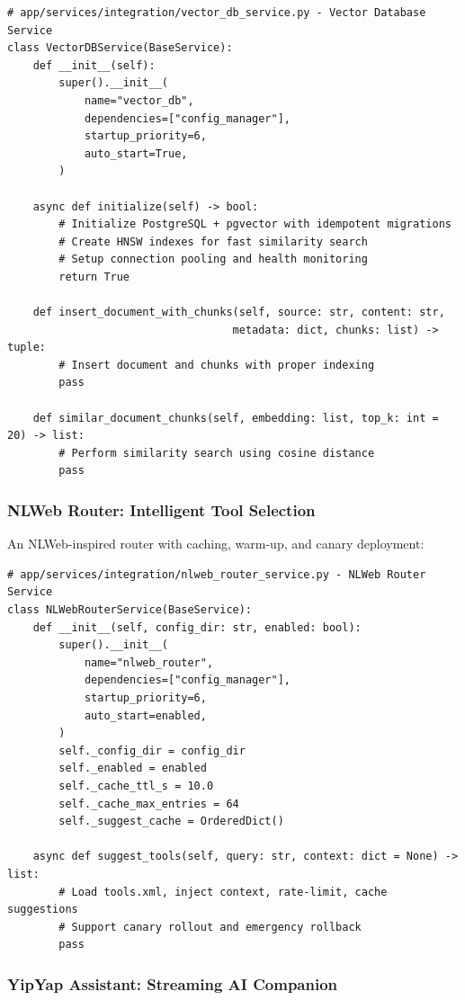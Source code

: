\documentclass[11pt]{article}
\begin{document}
\begin{lstlisting}[style=python]
# app/services/integration/vector_db_service.py - Vector Database Service
class VectorDBService(BaseService):
    def __init__(self):
        super().__init__(
            name="vector_db",
            dependencies=["config_manager"],
            startup_priority=6,
            auto_start=True,
        )
    
    async def initialize(self) -> bool:
        # Initialize PostgreSQL + pgvector with idempotent migrations
        # Create HNSW indexes for fast similarity search
        # Setup connection pooling and health monitoring
        return True
    
    def insert_document_with_chunks(self, source: str, content: str, 
                                   metadata: dict, chunks: list) -> tuple:
        # Insert document and chunks with proper indexing
        pass
    
    def similar_document_chunks(self, embedding: list, top_k: int = 20) -> list:
        # Perform similarity search using cosine distance
        pass
\end{lstlisting}

\subsubsection{NLWeb Router: Intelligent Tool Selection}

An NLWeb-inspired router with caching, warm-up, and canary deployment:

\begin{lstlisting}[style=python]
# app/services/integration/nlweb_router_service.py - NLWeb Router Service
class NLWebRouterService(BaseService):
    def __init__(self, config_dir: str, enabled: bool):
        super().__init__(
            name="nlweb_router",
            dependencies=["config_manager"],
            startup_priority=6,
            auto_start=enabled,
        )
        self._config_dir = config_dir
        self._enabled = enabled
        self._cache_ttl_s = 10.0
        self._cache_max_entries = 64
        self._suggest_cache = OrderedDict()
    
    async def suggest_tools(self, query: str, context: dict = None) -> list:
        # Load tools.xml, inject context, rate-limit, cache suggestions
        # Support canary rollout and emergency rollback
        pass
\end{lstlisting}

\subsubsection{YipYap Assistant: Streaming AI Companion}
\end{document}
